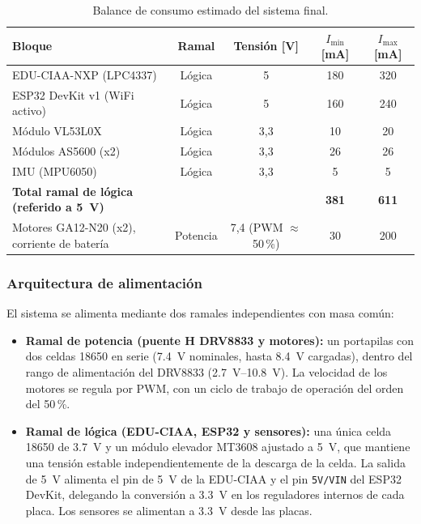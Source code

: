 \begin{table}[H]
\centering
\caption{Balance de consumo estimado del sistema final.}
\label{tab:balance}
\small
\begin{tabular}{L{4.6cm}cccc}
\toprule
Bloque & Ramal & Tensión [V] & $I_{\min}$ [mA] & $I_{\max}$ [mA] \\
\midrule
 EDU-CIAA-NXP (LPC4337) & Lógica & 5 & 180 & 320 \\
 ESP32 DevKit v1 (WiFi activo) & Lógica & 5 & 160 & 240 \\
 Módulo VL53L0X & Lógica & 3,3 & 10 & 20 \\
 Módulos AS5600 (x2) & Lógica & 3,3 & 26 & 26 \\
 IMU (MPU6050) & Lógica & 3,3 & 5 & 5 \\
\midrule
\textbf{Total ramal de lógica (referido a \SI{5}{V})} & & & \textbf{381} & \textbf{611} \\
\midrule
 Motores GA12-N20 (x2), corriente de batería & Potencia & 7,4 (PWM $\approx$50\,\%) & 30 & 200 \\
\bottomrule
\end{tabular}
\end{table}

\subsubsection{Arquitectura de alimentación}
El sistema se alimenta mediante dos ramales independientes con masa común:
\begin{itemize}[nosep]
  \item \textbf{Ramal de potencia (puente H DRV8833 y motores):} un portapilas con dos celdas 18650 en serie (\SI{7,4}{V} nominales, hasta \SI{8,4}{V} cargadas), dentro del rango de alimentación del DRV8833 (\SI{2,7}{V}--\SI{10,8}{V}). La velocidad de los motores se regula por PWM, con un ciclo de trabajo de operación del orden del 50\,\%.
  \item \textbf{Ramal de lógica (EDU-CIAA, ESP32 y sensores):} una única celda 18650 de \SI{3,7}{V} y un módulo elevador MT3608 ajustado a \SI{5}{V}, que mantiene una tensión estable independientemente de la descarga de la celda. La salida de \SI{5}{V} alimenta el pin de \SI{5}{V} de la EDU-CIAA y el pin \texttt{5V/VIN} del ESP32 DevKit, delegando la conversión a \SI{3,3}{V} en los reguladores internos de cada placa. Los sensores se alimentan a \SI{3,3}{V} desde las placas.
\end{itemize}

